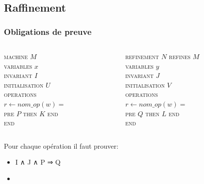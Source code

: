 \documentclass[11pt,a4paper,xcolor=table]{beamer} %
\begin{document}
\subsection{Raffinement}
\begin{frame}
\frametitle{Obligations de preuve}
\begin{columns}[t]
  \begin{column}{5cm}
    \textsc{machine} $M$ \\
    \textsc{variables} $x$ \\
    \textsc{invariant} $I$ \\
    \textsc{initialisation} $U$ \\
    \textsc{operations} \\
    \quad $r \longleftarrow nom\_op(w) =$ \\
    \qquad \textsc{pre} $P$ \textsc{then} $K$ \textsc{end} \\
    \textsc{end}
\end{column}
  
  \begin{column}{5cm}
    \textsc{refinement} $N$ \textsc{refines} $M$ \\
    \textsc{variables} $y$ \\
    \textsc{invariant} $J$ \\
    \textsc{initialisation} $V$ \\
    \textsc{operations} \\
    \quad $r \longleftarrow nom\_op(w) =$ \\
    \qquad \textsc{pre} $Q$ \textsc{then} $L$ \textsc{end} \\
    \textsc{end}  
  \end{column}
\end{columns}  
 
Pour chaque opération il faut prouver:
\begin{itemize}
\item I ∧ J ∧ P ⇒ Q 
\item 
\end{itemize}
\end{frame}
\fi
\end{document}
